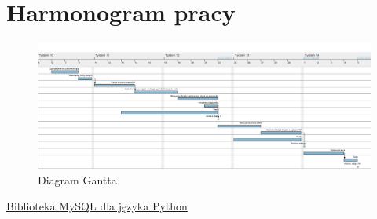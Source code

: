 \documentclass[10pt, a4paper]{article}
\begin{document}
\section{Harmonogram pracy}

\begin{figure}[H]
	\centering
	\includegraphics[width=1\textwidth]{figures/gantt.png}
	\caption{Diagram Gantta}
	\label{fig:DiagramGantta}
\end{figure}

\begin{thebibliography}{9}
	
	\href{https://dev.mysql.com/doc/connector-python/en/}{Biblioteka MySQL dla języka Python}
	
\end{thebibliography}
\end{document}

